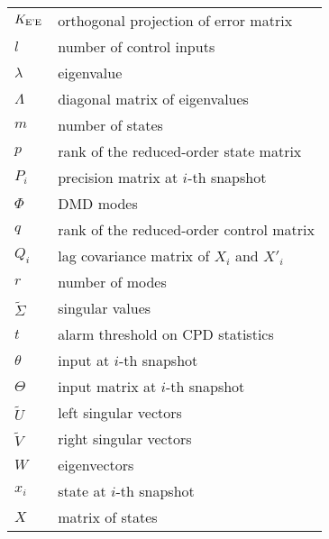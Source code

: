 \begin{longtable}{p{2cm}l}
	\(K _{\text{E'E}}\)                & orthogonal projection of error matrix                   \\
	\(l\)                          & number of control inputs                                \\
	\(\lambda \)                   & eigenvalue                                              \\
	\(\Lambda \)                   & diagonal matrix of eigenvalues                          \\
	\(m\)                          & number of states                                        \\
	\(p\)                          & rank of the reduced-order state matrix                  \\
	\(P_i\)                        & precision matrix at \(i\)-th snapshot                   \\
	\(\Phi \)                      & DMD modes                                               \\
	\(q\)                          & rank of the reduced-order control matrix                \\
	\(Q_i\)                        & lag covariance matrix of \(X_i\) and \(X'_i\)           \\
	\(r\)                          & number of modes                                         \\
	\(\tilde{\Sigma} \)            & singular values                                         \\
	\(t\)                          & alarm threshold on CPD statistics                       \\
	\(\theta \)                    & input at \(i\)-th snapshot                              \\
	\(\Theta \)                    & input matrix at \(i\)-th snapshot                       \\
	\(\tilde{U}\)                  & left singular vectors                                   \\
	\(\tilde{V}\)                  & right singular vectors                                  \\
	\( W \)                        & eigenvectors                                            \\
	\(x_i\)                        & state at \(i\)-th snapshot                              \\
	\(X\)                          & matrix of states                                        \\

\end{longtable}
